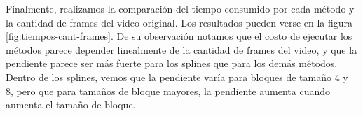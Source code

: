 Finalmente, realizamos la comparación del tiempo consumido por cada método y la cantidad de frames del video original. Los resultados pueden verse en la figura \ref{fig:tiempos-cant-frames}. De su observación notamos que el costo de ejecutar los métodos parece depender linealmente de la cantidad de frames del video, y que la pendiente parece ser más fuerte para los splines que para los demás métodos. Dentro de los splines, vemos que la pendiente varía para bloques de tamaño 4 y 8, pero que para tamaños de bloque mayores, la pendiente aumenta cuando aumenta el tamaño de bloque.